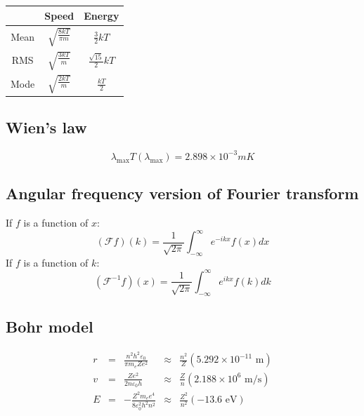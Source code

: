 \documentclass[12pt]{article}
\begin{document}
\begin{tabular}{ c|c|c } 
    & Speed & Energy \\
    \hline
    Mean & $\sqrt{ \frac{8kT}{\pi m} }$ & $ \frac{3}{2} kT$ \\ 
    \hline
    RMS & $\sqrt{ \frac{3kT}{m} }$ & $ \frac{\sqrt{15}}{2} kT$ \\ 
    \hline
    Mode & $\sqrt{ \frac{2kT}{m} }$ & $\frac{kT}{2}$ \\ 
\end{tabular}

\subsection{Wien's law}
\[ \lambda_\text{max} T(\lambda_\text{max}) = 2.898 \times 10^{-3} mK \]

\subsection{Angular frequency version of Fourier transform}
If $f$ is a function of $x$:
\[ (\mathcal{F}f)(k) = \frac{1}{\sqrt{2 \pi}} \int_{-\infty}^\infty e^{-ikx}f(x) dx \]
If $f$ is a function of $k$:
\[ (\mathcal{F}^{-1}f)(x) = \frac{1}{\sqrt{2 \pi}} \int_{-\infty}^\infty e^{ikx}f(k) dk \]

\subsection{Bohr model}
\begin{align*}
    r &=& \frac{n^2 h^2 \varepsilon_0}{\pi m_e Z e^2} &\approx& \frac{n^2}{Z}  (5.292\times 10^{-11} \text{ m}) \\
    v &=& \frac{Z e^2}{2 n \varepsilon_0 h} &\approx& \frac{Z}{n} (2.188\times 10^{6} \text{ m/s}) \\
    E &=& - \frac{Z^2 m_e e^4}{8 \varepsilon_0^2 h^2 n^2} &\approx& \frac{Z^2}{n^2} (-13.6 \text{ eV}) 
\end{align*}
\end{document}
